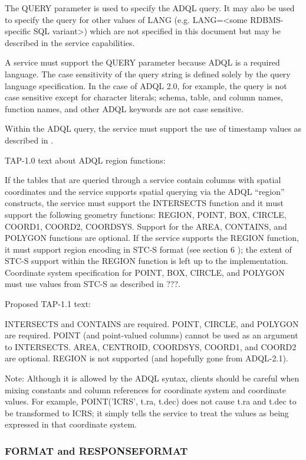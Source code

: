 \documentclass[11pt,letter]{ivoa}
\begin{document}
The QUERY parameter is used to specify the ADQL query. It may also be used to 
specify the query for other values of LANG (e.g. LANG=<some RDBMS-specific SQL 
variant>) which are not specified in this document but may be described in the 
service capabilities.

A service must support the QUERY parameter because ADQL is a required language.  
The case sensitivity of the query string is defined solely by the query language 
specification. In the case of ADQL 2.0, for example, the query is not case 
sensitive except for character  literals; schema, table, and column names, 
function names, and other ADQL keywords are not case sensitive.

Within the ADQL query, the service must support the use of timestamp values as 
described in \citep{std:DALI}.

TAP-1.0 text about ADQL region functions:

If the tables that are queried through a service contain columns with spatial 
coordinates and the service supports spatial querying via the ADQL “region” 
constructs, the service must support the INTERSECTS function and it must support 
the following geometry functions: REGION, POINT, BOX, CIRCLE, COORD1, COORD2, 
COORDSYS. Support for the AREA, CONTAINS, and POLYGON functions are optional. If 
the service supports the REGION function, it must support region encoding in 
STC-S format (see section 6 ); the extent of STC-S support within the REGION 
function is left up to the implementation. Coordinate system specification for 
POINT, BOX, CIRCLE, and POLYGON must use values from STC-S as described in ???.

Proposed TAP-1.1 text:

INTERSECTS and CONTAINS are required. POINT, CIRCLE, and POLYGON are required. 
POINT (and point-valued columns) cannot be used as an argument to INTERSECTS.
AREA, CENTROID, COORDSYS, COORD1, and COORD2 are optional. REGION is not 
supported (and hopefully gone from ADQL-2.1). 

Note: Although it is allowed by the ADQL syntax, clients should be careful when 
mixing constants and column references for coordinate system and coordinate 
values. For example, POINT('ICRS', t.ra, t.dec) does not cause t.ra and t.dec to 
be transformed to ICRS; it simply tells the service to treat the values  as 
being expressed in that coordinate system.

\subsubsection{FORMAT and RESPONSEFORMAT}
\label{sec:RESPONSEFORMAT}
\end{document}
